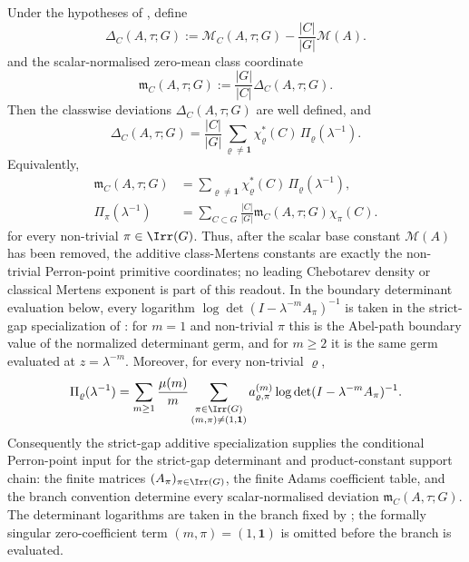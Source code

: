 \begin{proposition}
  \label{prop:class-mertens-deviations}
  Under the hypotheses of , define
  \[
    \Delta_C(A,\tau;G)
    :=\mathcal M_C(A,\tau;G)-\frac{|C|}{|G|}\mathcal M(A).
  \]
  and the scalar-normalised zero-mean class coordinate
  \[
    \mathfrak m_C(A,\tau;G)
    :=\frac{|G|}{|C|}\Delta_C(A,\tau;G).
  \]
  Then the classwise deviations \(\Delta_C(A,\tau;G)\) are well
  defined, and
  \begin{equation}\label{eq:class-mertens-fourier-expansion}
    \Delta_C(A,\tau;G)
    =
    \frac{|C|}{|G|}
      \sum_{\varrho\neq\mathbf 1}
        \chi_\varrho^\ast(C)\,\Pi_\varrho(\lambda^{-1}).
  \end{equation}
  Equivalently,
  \begin{equation}\label{eq:class-mertens-normalised-deviation-readout}
    \begin{aligned}
    \mathfrak m_C(A,\tau;G)
    &=
      \sum_{\varrho\neq\mathbf 1}
        \chi_\varrho^\ast(C)\,\Pi_\varrho(\lambda^{-1}),\\
    \Pi_\pi(\lambda^{-1})
    &=
      \sum_{C\subset G}\frac{|C|}{|G|}
        \mathfrak m_C(A,\tau;G)\chi_\pi(C).
    \end{aligned}
  \end{equation}
  for every non-trivial \(\pi\in\Irr(G)\). Thus, after the scalar base
  constant \(\mathcal M(A)\) has been removed, the additive class-Mertens
  constants are exactly the non-trivial Perron-point primitive coordinates;
  no leading Chebotarev density or classical Mertens exponent is part of this
  readout.
  In the boundary determinant evaluation below, every logarithm
  \(\log\det(I-\lambda^{-m}A_\pi)^{-1}\) is taken in the strict-gap
  specialization of : for
  \(m=1\) and non-trivial \(\pi\) this is the Abel-path boundary value of the
  normalized determinant germ, and for \(m\ge2\) it is the same germ evaluated
  at \(z=\lambda^{-m}\).
  Moreover, for every non-trivial \(\varrho\),
  \begin{equation}\label{eq:class-mertens-determinant}
    \Pi_\varrho(\lambda^{-1})
    =
    \sum_{m\ge 1}\frac{\mu(m)}{m}
      \sum_{\substack{\pi\in\Irr(G)\\(m,\pi)\neq(1,\mathbf 1)}}
        a_{\varrho,\pi}^{(m)}
        \log\det(I-\lambda^{-m}A_\pi)^{-1}.
  \end{equation}
  Consequently the strict-gap additive specialization supplies the conditional
  Perron-point input for the strict-gap determinant and product-constant
  support chain: the finite matrices
  \((A_\pi)_{\pi\in\Irr(G)}\), the finite Adams coefficient table, and the
  branch convention determine every scalar-normalised deviation
  \(\mathfrak m_C(A,\tau;G)\).  The determinant logarithms are taken in the
  branch fixed by ; the
  formally singular zero-coefficient term
  \((m,\pi)=(1,\mathbf1)\) is omitted before the branch is evaluated.
\end{proposition}

